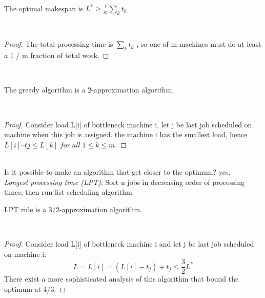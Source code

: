 \begin{claim}
    The optimal makespan is $L^{*} \geq \frac{1}{m} \sum _{k} t_{k}$
\end{claim}\\

\begin{proof}
    The total processing time is $\sum_{k} t_{k}$ , so one of m machines must do at least a 1 / m fraction of total work.
\end{proof}\\

\begin{claim}
    The greedy algorithm is a 2-approximation algorithm.
\end{claim}\\

\begin{proof}
    Consider load L[i] of bottleneck machine i, let j be last job scheduled on machine when this job is assigned. the machine i has the smallest load, hence $L[i]– tj \leq L[k] \; for \; all \; 1 \leq k \leq m$.
\end{proof}\\

Is it possible to make an algorithm that get closer to the optimum? yes.\\
\emph{Longest processing time (LPT)}: Sort n jobs in decreasing order of processing times; then run list scheduling algorithm.\\

\begin{claim}
    LPT rule is a 3/2-approximation algorithm.
\end{claim}\\

\begin{proof}
    Consider load L[i] of bottleneck machine i and let j be last job scheduled on machine i:
    \[ L = L[i] = (L[i] -t_{j}) + t_{j} \leq \frac{3}{2} L^{*}\]
    There exist a more sophisticated analysis of this algorithm that bound the optimum at 4/3.
\end{proof}

